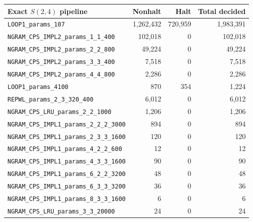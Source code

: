 \documentclass[a4paper,british]{article}
\theoremstyle{definition} %
\numberwithin{equation}{section}
\theoremstyle{definition} %
\begin{document}
\begin{table}[h!]
    \centering
    \begin{tabular}{|lrrr|}
        \hline
        Exact $S(2,4)$ pipeline                           & Nonhalt       & Halt      & Total decided \\
        \hline
        \texttt{LOOP1\_params\_107}                       & 1{,}262{,}432 & 720{,}959 & 1{,}983{,}391 \\
        \texttt{NGRAM\_CPS\_IMPL2\_params\_1\_1\_400}     & 102{,}018     & 0         & 102{,}018     \\
        \texttt{NGRAM\_CPS\_IMPL2\_params\_2\_2\_800}     & 49{,}224      & 0         & 49{,}224      \\
        \texttt{NGRAM\_CPS\_IMPL2\_params\_3\_3\_400}     & 7{,}518       & 0         & 7{,}518       \\
        \texttt{NGRAM\_CPS\_IMPL2\_params\_4\_4\_800}     & 2{,}286       & 0         & 2{,}286       \\
        \texttt{LOOP1\_params\_4100}                      & 870           & 354       & 1{,}224       \\
        \texttt{REPWL\_params\_2\_3\_320\_400}            & 6{,}012       & 0         & 6{,}012       \\
        \texttt{NGRAM\_CPS\_LRU\_params\_2\_2\_1000}      & 1{,}206       & 0         & 1{,}206       \\
        \texttt{NGRAM\_CPS\_IMPL1\_params\_2\_2\_2\_3000} & 894           & 0         & 894           \\
        \texttt{NGRAM\_CPS\_IMPL1\_params\_2\_3\_3\_1600} & 120           & 0         & 120           \\
        \texttt{NGRAM\_CPS\_IMPL1\_params\_4\_2\_2\_600}  & 12            & 0         & 12            \\
        \texttt{NGRAM\_CPS\_IMPL1\_params\_4\_3\_3\_1600} & 90            & 0         & 90            \\
        \texttt{NGRAM\_CPS\_IMPL1\_params\_6\_2\_2\_3200} & 48            & 0         & 48            \\
        \texttt{NGRAM\_CPS\_IMPL1\_params\_6\_3\_3\_3200} & 36            & 0         & 36            \\
        \texttt{NGRAM\_CPS\_IMPL1\_params\_8\_3\_3\_1600} & 6             & 0         & 6             \\
        \texttt{NGRAM\_CPS\_LRU\_params\_3\_3\_20000}     & 24            & 0         & 24            \\

\end{tabular}
\end{table}
\end{document}
